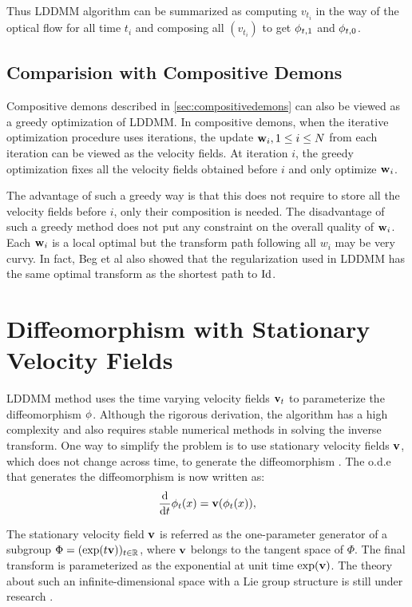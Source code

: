 \documentclass[letterpaper,12pt]{article}
\begin{document}
Thus LDDMM algorithm can be summarized as computing $v_{t_i}$ in the way of the optical flow for all time $t_i$ and composing all $(v_{t_i})$ to get $\phi_{t, 1}$ and $\phi_{t, 0}$.


\subsection{Comparision with Compositive Demons}

Compositive demons described in \ref{sec:compositivedemons} can also be viewed as a greedy optimization of LDDMM. In compositive demons, when the iterative optimization procedure uses iterations, the update $\mathbf{w}_i, 1 \leq i \leq N$ from each iteration can be viewed as the velocity fields. At iteration $i$, the greedy optimization fixes all the velocity fields obtained before $i$ and only optimize $\mathbf{w}_i$. 

The advantage of such a greedy way is that this does not require to store all the velocity fields before $i$, only their composition is needed. The disadvantage of such a greedy method does not put any constraint on the overall quality of $\mathbf{w}_i$. Each $\mathbf{w}_i$ is a local optimal but the transform path following all $w_i$ may be very curvy. In fact, Beg et al also \cite{Beg2005Computing} showed that the regularization used in LDDMM has the same optimal transform as the shortest path to $\text{Id}$.


\section{Diffeomorphism with Stationary Velocity Fields}

LDDMM method \cite{Beg2005Computing} uses the time varying velocity fields $\mathbf{v}_t$ to parameterize the diffeomorphism $\phi$. Although the rigorous derivation, the algorithm has a high complexity and also requires stable numerical methods in solving the inverse transform. One way to simplify the problem is to use stationary velocity fields $\mathbf{v}$, which does not change across time, to generate the diffeomorphism \cite{Arsigny2006,Ashburner2007,Vercauteren2007,Vercauteren2008Symmetric,Hernandez2009}. The o.d.e that generates the diffeomorphism is now written as:
\begin{align}
\frac{\text{d}}{\text{d} t} \phi_t(x) = \mathbf{v}(\phi_t(x)), 
\end{align}

The stationary velocity field $\mathbf{v}$ is referred as the one-parameter generator of a subgroup $\Phi=(\exp(t\mathbf{v}))_{t \in \mathbb{R}}$, where $\mathbf{v}$ belongs to the tangent space of $\Phi$. The final transform is parameterized as the exponential at unit time $\exp(\mathbf{v})$. The theory about such an infinite-dimensional space with a Lie group structure is still under research \cite{Arsigny2006, Vercauteren2008Symmetric, Sternberg1964, Mahony2002}.  
\end{document}
